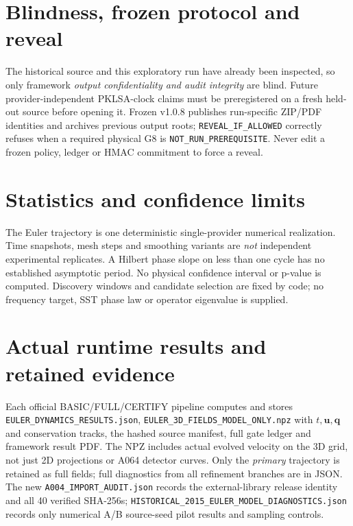 \documentclass[11pt,a4paper]{article}
\begin{document}
\section{Blindness, frozen protocol and reveal}
The historical source and this exploratory run have already been inspected, so only framework \emph{output confidentiality and audit integrity} are blind. Future provider-independent PKLSA-clock claims must be preregistered on a fresh held-out source before opening it. Frozen v1.0.8 publishes run-specific ZIP/PDF identities and archives previous output roots; \texttt{REVEAL\_IF\_ALLOWED} correctly refuses when a required physical G8 is \texttt{NOT\_RUN\_PREREQUISITE}. Never edit a frozen policy, ledger or HMAC commitment to force a reveal.

\section{Statistics and confidence limits}
The Euler trajectory is one deterministic single-provider numerical realization. Time snapshots, mesh steps and smoothing variants are \emph{not} independent experimental replicates. A Hilbert phase slope on less than one cycle has no established asymptotic period. No physical confidence interval or p-value is computed. Discovery windows and candidate selection are fixed by code; no frequency target, SST phase law or operator eigenvalue is supplied.

\section{Actual runtime results and retained evidence}
Each official BASIC/FULL/CERTIFY pipeline computes and stores \texttt{EULER\_DYNAMICS\_RESULTS.json}, \texttt{EULER\_3D\_FIELDS\_MODEL\_ONLY.npz} with $t,\mathbf u,\mathbf q$ and conservation tracks, the hashed source manifest, full gate ledger and framework result PDF. The NPZ includes actual evolved velocity on the 3D grid, not just 2D projections or A064 detector curves. Only the \emph{primary} trajectory is retained as full fields; full diagnostics from all refinement branches are in JSON. The new \texttt{A004\_IMPORT\_AUDIT.json} records the external-library release identity and all 40 verified SHA-256s; \texttt{HISTORICAL\_2015\_EULER\_MODEL\_DIAGNOSTICS.json} records only numerical A/B source-seed pilot results and sampling controls.
\end{document}
